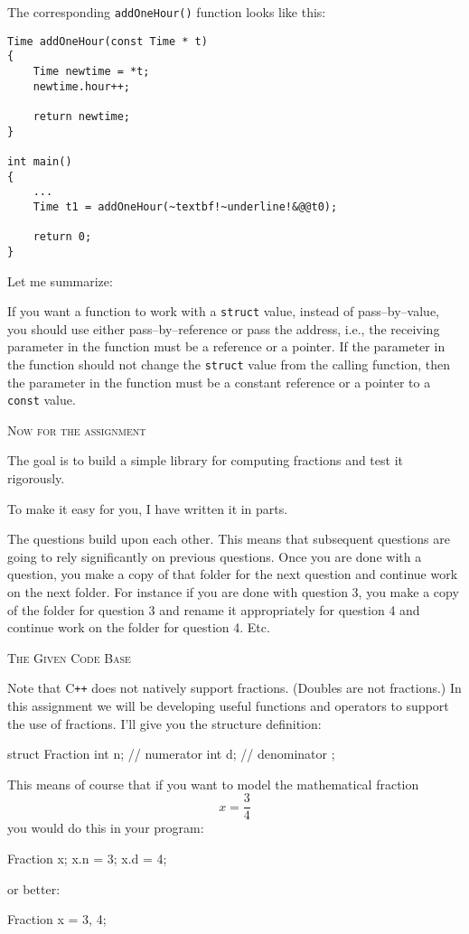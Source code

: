 The corresponding \verb!addOneHour()! function looks like this:
\begin{Verbatim}[frame=single, commandchars=~!@]
Time addOneHour(const Time * t)
{
    Time newtime = *t;
    newtime.hour++;

    return newtime;
}

int main()
{
    ...
    Time t1 = addOneHour(~textbf!~underline!&@@t0);

    return 0;
}
\end{Verbatim}

Let me summarize:
\begin{itemize}
  \li If you want a function to work with a \verb!struct! value, instead of
pass--by--value, you should use either pass--by--reference or pass the address,
i.e., the receiving parameter in the function must be a reference or a pointer.
  \li If the parameter in the function should not change the \verb!struct!
value from the calling function, then the parameter in the function must be a
constant reference or a pointer to a \verb!const! value.
\end{itemize}




\newpage
\textsc{Now for the assignment}

The goal is to build a simple library for computing fractions and test it
rigorously.

To make it easy for you, I have written it in parts.

The questions build upon each other. This means that subsequent questions are
going to rely significantly on previous questions.
Once you are done with a question, you make a copy of that folder
for the next question and continue work on the next folder.
For instance if you are done with question 3, you make a copy of the
folder for question 3 and rename it appropriately for question 4 and
continue work on the folder for question 4. Etc.



\newpage
\textsc{The Given Code Base}

Note that C\texttt{++}
does not natively support fractions. (Doubles are not fractions.)
In this assignment we will be developing useful functions and operators to
support the use of fractions. I'll give you the structure definition:
\begin{console}
struct Fraction
{
    int n; // numerator
    int d; // denominator
};
\end{console}

This means of course that if you want to model the mathematical fraction
\[x = \frac{3}{4}\]
you would do this in your program:
\begin{console}
Fraction x;
x.n = 3;
x.d = 4;
\end{console}
or better:
\begin{console}
Fraction x = {3, 4};
\end{console}

